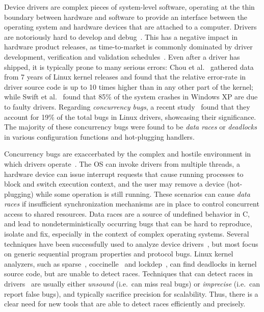 Device drivers are complex pieces of system-level software, operating at the thin boundary between hardware and software
to provide an interface between the operating system and hardware devices that are attached to a computer.
Drivers are notoriously hard to develop and debug~\cite{corbet2005linux}. This has a negative impact in hardware product releases, as time-to-market is commonly dominated by driver development, verification and validation schedules~\cite{yavatkar2012era}.
%
Even after a driver has shipped, it is typically prone to many serious errors: Chou et al.~\cite{chou2001empirical} gathered data from 7 years of Linux kernel releases and found that the relative error-rate in driver source code is up to 10 times higher than in any other part of the kernel; while Swift et al.~\cite{Swift2003windowsxp} found that 85\% of the system crashes in Windows XP are due to faulty drivers. Regarding \emph{concurrency bugs}, a recent study~\cite{ryzhyk2009dingo} found that they account for 19\% of the total bugs in Linux drivers, showcasing their significance. The majority of these concurrency bugs were found to be \emph{data races} or \emph{deadlocks} in various configuration functions and hot-plugging handlers.

Concurrency bugs are exaccerbated by the complex and hostile environment in which drivers operate~\cite{corbet2005linux}. The OS can invoke drivers from multiple threads, a hardware device can issue interrupt requests that cause running processes to block and switch execution context, and the user may remove a device (hot-plugging) while some operation is still running.  These scenarios can cause \emph{data races} if insufficient synchronization mechanisms are in place to control concurrent access to shared resources.
%
Data races are a source of undefined behavior in C, and lead to nondeterministically occurring bugs that can be hard to reproduce, isolate and fix, especially in the context of complex operating systems.
%
Several techniques have been successfully used to analyze device drivers~\cite{ball2006thorough, clarke2004predicate, engler2000checking, henzinger2002temporal, cook2006termination, kuznetsov2010testing, renzelmann2012symdrive, lal2012corral}, but most focus on generic sequential program properties and protocol bugs. Linux kernel analyzers, such as sparse~\cite{corbet2004sparse}, coccinelle~\cite{padioleau2008doc} and lockdep~\cite{corbet2006lock}, can find deadlocks in kernel source code, but are unable to detect races. Techniques that can detect races in drivers~\cite{qadeer2004kiss, pratikakis2006locksmith, voung2007relay, lal2012corral} are usually either \emph{unsound} (i.e.\ can miss real bugs) or \emph{imprecise} (i.e.\ can report false bugs), and typically sacrifice precision for scalability. Thus, there is a clear need for new tools that are able to detect races efficiently and precisely.

